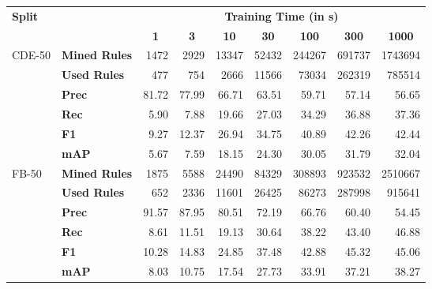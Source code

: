 \begin{tabular}{| l | l | r | r | r | r | r | r | r |}
    \hline

    \multirow{2}{*}{\textbf{Split}} &
    &
    \multicolumn{7}{|c|}{\textbf{Training Time (in s)}} \\

    &
    &
    \multicolumn{1}{|c|}{\textbf{1}} &
    \multicolumn{1}{|c|}{\textbf{3}} &
    \multicolumn{1}{|c|}{\textbf{10}} &
    \multicolumn{1}{|c|}{\textbf{30}} &
    \multicolumn{1}{|c|}{\textbf{100}} &
    \multicolumn{1}{|c|}{\textbf{300}} &
    \multicolumn{1}{|c|}{\textbf{1000}} \\

    \hline \hline

    \multirow{6}{*}{CDE-50}
    & \textbf{Mined Rules} & \num{1472} & \num{2929} & \num{13347} & \num{52432} & \num{244267} & \num{691737} & \num{1743694} \\
    & \textbf{Used Rules}  & \num{477}  & \num{754}  & \num{2666}  & \num{11566} & \num{73034}  & \num{262319} & \num{785514}  \\ \cline{2-9}
    & \textbf{Prec}        & 81.72      & 77.99      & 66.71       & 63.51       & 59.71        & 57.14        & 56.65         \\
    & \textbf{Rec}         & 5.90       & 7.88       & 19.66       & 27.03       & 34.29        & 36.88        & 37.36         \\
    & \textbf{F1}          & 9.27       & 12.37      & 26.94       & 34.75       & 40.89        & 42.26        & 42.44         \\
    & \textbf{mAP}         & 5.67       & 7.59       & 18.15       & 24.30       & 30.05        & 31.79        & 32.04         \\ \hline \hline

    \multirow{6}{*}{FB-50}
    & \textbf{Mined Rules} & \num{1875} & \num{5588} & \num{24490} & \num{84329} & \num{308893} & \num{923532} & \num{2510667} \\
    & \textbf{Used Rules}  & \num{652}  & \num{2336} & \num{11601} & \num{26425} & \num{86273}  & \num{287998} & \num{915641}  \\ \cline{2-9}
    & \textbf{Prec}        & 91.57      & 87.95      & 80.51       & 72.19       & 66.76        & 60.40        & 54.45         \\
    & \textbf{Rec}         & 8.61       & 11.51      & 19.13       & 30.64       & 38.22        & 43.40        & 46.88         \\
    & \textbf{F1}          & 10.28      & 14.83      & 24.85       & 37.48       & 42.88        & 45.32        & 45.06         \\
    & \textbf{mAP}         & 8.03       & 10.75      & 17.54       & 27.73       & 33.91        & 37.21        & 38.27         \\ \hline

\end{tabular}
